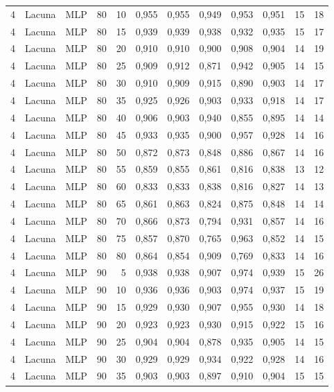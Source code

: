 \begin{longtable}{ccclrrrrrrrr}
4 & Lacuna & MLP & 80 & 10 & 0,955 & 0,955 & 0,949 & 0,953 & 0,951 & 15 & 18 \\
4 & Lacuna & MLP & 80 & 15 & 0,939 & 0,939 & 0,938 & 0,932 & 0,935 & 15 & 17 \\
4 & Lacuna & MLP & 80 & 20 & 0,910 & 0,910 & 0,900 & 0,908 & 0,904 & 14 & 19 \\
4 & Lacuna & MLP & 80 & 25 & 0,909 & 0,912 & 0,871 & 0,942 & 0,905 & 14 & 15 \\
4 & Lacuna & MLP & 80 & 30 & 0,910 & 0,909 & 0,915 & 0,890 & 0,903 & 14 & 17 \\
4 & Lacuna & MLP & 80 & 35 & 0,925 & 0,926 & 0,903 & 0,933 & 0,918 & 14 & 17 \\
4 & Lacuna & MLP & 80 & 40 & 0,906 & 0,903 & 0,940 & 0,855 & 0,895 & 14 & 14 \\
4 & Lacuna & MLP & 80 & 45 & 0,933 & 0,935 & 0,900 & 0,957 & 0,928 & 14 & 16 \\
4 & Lacuna & MLP & 80 & 50 & 0,872 & 0,873 & 0,848 & 0,886 & 0,867 & 14 & 16 \\
4 & Lacuna & MLP & 80 & 55 & 0,859 & 0,855 & 0,861 & 0,816 & 0,838 & 13 & 12 \\
4 & Lacuna & MLP & 80 & 60 & 0,833 & 0,833 & 0,838 & 0,816 & 0,827 & 14 & 13 \\
4 & Lacuna & MLP & 80 & 65 & 0,861 & 0,863 & 0,824 & 0,875 & 0,848 & 14 & 14 \\
4 & Lacuna & MLP & 80 & 70 & 0,866 & 0,873 & 0,794 & 0,931 & 0,857 & 14 & 16 \\
4 & Lacuna & MLP & 80 & 75 & 0,857 & 0,870 & 0,765 & 0,963 & 0,852 & 14 & 15 \\
4 & Lacuna & MLP & 80 & 80 & 0,864 & 0,854 & 0,909 & 0,769 & 0,833 & 14 & 16 \\
4 & Lacuna & MLP & 90 & 5 & 0,938 & 0,938 & 0,907 & 0,974 & 0,939 & 15 & 26 \\
4 & Lacuna & MLP & 90 & 10 & 0,936 & 0,936 & 0,903 & 0,974 & 0,937 & 15 & 19 \\
4 & Lacuna & MLP & 90 & 15 & 0,929 & 0,930 & 0,907 & 0,955 & 0,930 & 14 & 18 \\
4 & Lacuna & MLP & 90 & 20 & 0,923 & 0,923 & 0,930 & 0,915 & 0,922 & 15 & 16 \\
4 & Lacuna & MLP & 90 & 25 & 0,904 & 0,904 & 0,878 & 0,935 & 0,905 & 14 & 15 \\
4 & Lacuna & MLP & 90 & 30 & 0,929 & 0,929 & 0,934 & 0,922 & 0,928 & 14 & 16 \\
4 & Lacuna & MLP & 90 & 35 & 0,903 & 0,903 & 0,897 & 0,910 & 0,904 & 15 & 15 \\

\end{longtable}
